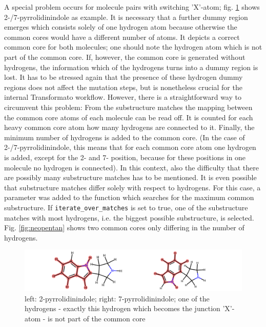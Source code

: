 A special problem occurs for molecule pairs with switching 'X'-atom; fig. \ref{fig:pyrrolidinindole} shows 2-/7-pyrrolidinindole as example. It is necessary that a further dummy region emerges which consists solely of one hydrogen atom because otherwise the common cores would have a different number of atoms. It depicts a correct common core for both molecules; one should note the hydrogen atom which is not part of the common core. If, however, the common core is generated without hydrogens, the information which of the hydrogens turns into a dummy region is lost.
It has to be stressed again that the presence of these hydrogen dummy regions does not affect the mutation steps, but is nonetheless crucial for the internal Transformato workflow. However, there is a straightforward way to circumvent this problem: From the substructure matches the mapping between the common core atoms of each molecule can be read off. It is counted for each heavy common core atom how many hydrogens are connected to it. Finally, the minimum number of hydrogens is added to the common core. (In the case of 2-/7-pyrrolidinindole, this means that for each common core atom one hydrogen is added, except for the 2- and 7- position, because for these positions in one molecule no hydrogen is connected).
In this context, also the difficulty that there are possibly many substructure matches has to be mentioned.
It is even possible that substructure matches differ solely with respect to hydrogens. For this case, a parameter was added to the function which searches for the maximum common substructure. If \texttt{iterate\_over\_matches} is set to true, one of the substructure matches with most hydrogens, i.e. the biggest possible substructure, is selected. Fig. \ref{fig:neopentan} shows two common cores only differing in the number of hydrogens.



\begin{figure}
	\includegraphics[scale=0.8]{pyrrolidinindole}
	
	\caption{
		left: 2-pyrrolidinindole; right: 7-pyrrolidinindole; 
		one of the hydrogens - exactly this hydrogen which becomes the junction 'X'-atom - is not part of the common core}
	\label{fig:pyrrolidinindole}
\end{figure}


